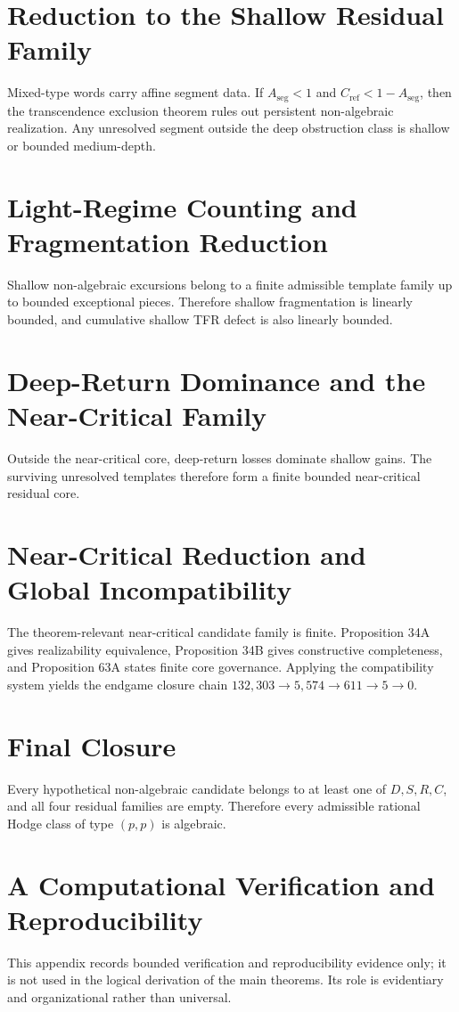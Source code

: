 \documentclass[11pt]{article}
\theoremstyle{definition}
\begin{document}
\section{Reduction to the Shallow Residual Family}
Mixed-type words carry affine segment data. If $A_{\mathrm{seg}}<1$ and $C_{\mathrm{ref}}<1-A_{\mathrm{seg}}$, then the transcendence exclusion theorem rules out persistent non-algebraic realization. Any unresolved segment outside the deep obstruction class is shallow or bounded medium-depth.
\section{Light-Regime Counting and Fragmentation Reduction}
Shallow non-algebraic excursions belong to a finite admissible template family up to bounded exceptional pieces. Therefore shallow fragmentation is linearly bounded, and cumulative shallow TFR defect is also linearly bounded.
\section{Deep-Return Dominance and the Near-Critical Family}
Outside the near-critical core, deep-return losses dominate shallow gains. The surviving unresolved templates therefore form a finite bounded near-critical residual core.
\section{Near-Critical Reduction and Global Incompatibility}
The theorem-relevant near-critical candidate family is finite. Proposition 34A gives realizability equivalence, Proposition 34B gives constructive completeness, and Proposition 63A states finite core governance. Applying the compatibility system yields the endgame closure chain $132{,}303 \to 5{,}574 \to 611 \to 5 \to 0$.
\section{Final Closure}
Every hypothetical non-algebraic candidate belongs to at least one of $D,S,R,C$, and all four residual families are empty. Therefore every admissible rational Hodge class of type $(p,p)$ is algebraic.

\section*{A Computational Verification and Reproducibility}
This appendix records bounded verification and reproducibility evidence only; it is not used in the logical derivation of the main theorems. Its role is evidentiary and organizational rather than universal.
\end{document}

